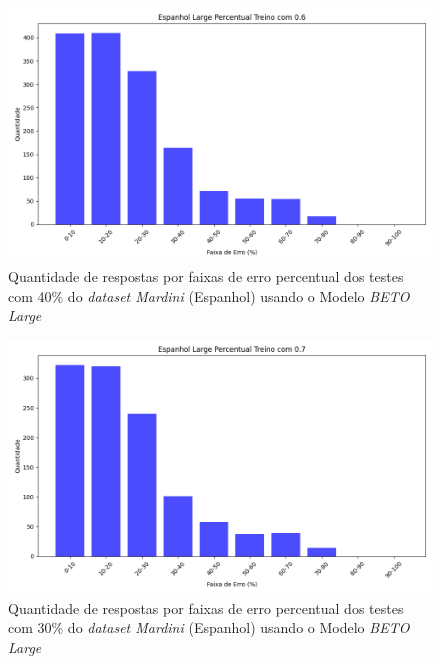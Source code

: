 \begin{figure}[h!]
\includegraphics[width=\textwidth]{img/grafsEsp/Espanhol Large Percentual Treino com 0.6_quantidade.png}
\caption{Quantidade de respostas por faixas de erro percentual dos testes com 40\% do \textit{dataset Mardini} (Espanhol) usando o Modelo \textit{BETO Large}}\label{figure:8}
\end{figure}

\begin{figure}[h!]
\includegraphics[width=\textwidth]{img/grafsEsp/Espanhol Large Percentual Treino com 0.7_quantidade.png}
\caption{Quantidade de respostas por faixas de erro percentual dos testes com 30\% do \textit{dataset Mardini} (Espanhol) usando o Modelo \textit{BETO Large}}\label{figure:9}
\end{figure}

